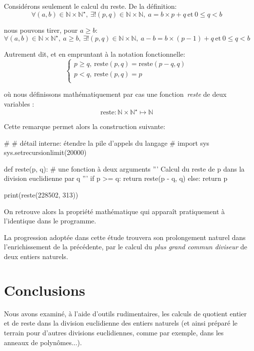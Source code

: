 Considérons seulement le calcul du reste. De la définition:
\[
\forall \left( a , b \right) \in \mathbb{N} \times \mathbb{N}^{\star},\ \exists! \left( p , q \right) \in \mathbb{N} \times \mathbb{N}, \ a = b \times p + q \ \text{et}\ 0 \leqslant q < b
\]

nous pouvons tirer, pour $a \geqslant b$:
\[
\forall \left( a , b \right) \in \mathbb{N} \times \mathbb{N}^{\star},\ a \geqslant b,\ \exists! \left( p , q \right) \in \mathbb{N} \times \mathbb{N}, \ a - b = b \times \left( p - 1 \right) + q \ \text{et}\ 0 \leqslant q < b
\]

Autrement dit, et en empruntant à la notation fonctionnelle:
\[
\left\lbrace
\begin{array}{l}
p \geqslant q,\ \textrm{reste}\!\left( p , q \right) = \textrm{reste}\!\left( p - q , q \right)\\
p < q,\ \textrm{reste}\!\left( p , q \right) = p\\
\end{array}
\right.
\]

où nous définissons mathématiquement par cas une fonction~\emph{reste} de deux variables :
\[
\textrm{reste} : \mathbb{N} \times \mathbb{N}^{\star} \mapsto \mathbb{N}
\]

Cette remarque permet alors la construction suivante:

\begin{python}[reste.py]
#
# détail interne: étendre la pile d'appels du langage
#
import sys
sys.setrecursionlimit(20000)

def reste(p, q): # une fonction à deux arguments
	'''
	Calcul du reste de p dans la division euclidienne par q
	'''
	if p >= q:
		return reste(p - q, q)
	else:
		return p
	
print(reste(228502, 313))
\end{python}

On retrouve alors la propriété mathématique qui apparaît pratiquement à l'identique dans le programme.

La progression adoptée dans cette étude trouvera son prolongement naturel dans l'enrichissement de la  précédente, par le calcul du \emph{plus grand commun diviseur} de deux entiers naturels.



\section{Conclusions}

Nous avons examiné, à l'aide d'outils rudimentaires, les calculs de quotient entier et de reste dans la division euclidienne des entiers naturels (et ainsi préparé le terrain pour d'autres divisions euclidiennes, comme par exemple, dans les anneaux de polynômes...).

